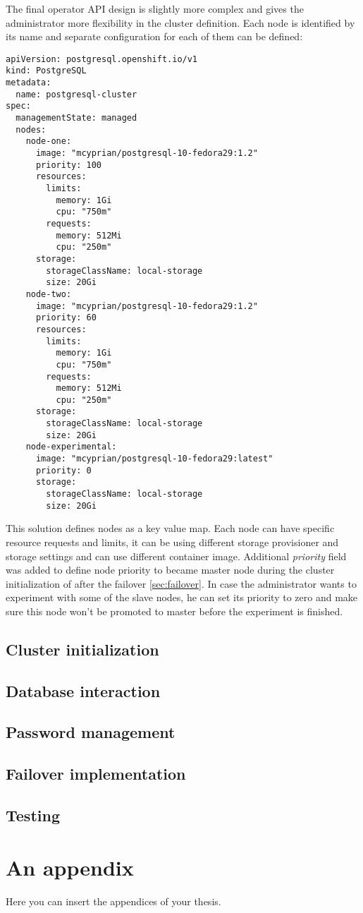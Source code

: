 \documentclass[
  digital, %
  twoside, %
  table,   %
  lof,     %
  lot,     %
]{fithesis3}
\begin{document}
The final operator API design is slightly more complex and gives the administrator more flexibility in the cluster definition. Each node is identified by its name and separate configuration for each of them can be defined:
\begin{lstlisting}
apiVersion: postgresql.openshift.io/v1
kind: PostgreSQL
metadata:
  name: postgresql-cluster
spec:
  managementState: managed
  nodes:
    node-one:
      image: "mcyprian/postgresql-10-fedora29:1.2"
      priority: 100
      resources:
        limits:
          memory: 1Gi
          cpu: "750m"
        requests:
          memory: 512Mi
          cpu: "250m"
      storage:
        storageClassName: local-storage
        size: 20Gi
    node-two:
      image: "mcyprian/postgresql-10-fedora29:1.2"
      priority: 60
      resources:
        limits:
          memory: 1Gi
          cpu: "750m"
        requests:
          memory: 512Mi
          cpu: "250m"
      storage:
        storageClassName: local-storage
        size: 20Gi
    node-experimental:
      image: "mcyprian/postgresql-10-fedora29:latest"
      priority: 0
      storage:
        storageClassName: local-storage
        size: 20Gi
\end{lstlisting}

This solution defines nodes as a key value map. Each node can have specific resource requests and limits, it can be using different storage provisioner and storage settings and can use different container image. Additional \textit{priority} field was added to define node priority to became master node during the cluster initialization of after the failover \ref{sec:failover}. In case the administrator wants to experiment with some of the slave nodes, he can set its priority to zero and make sure this node won't be promoted to master before the experiment is finished.

\section{Cluster initialization}
\section{Database interaction}
\section{Password management}
\section{Failover implementation}
\section{Testing}

\appendix %
\chapter{An appendix}
Here you can insert the appendices of your thesis.
\end{document}
